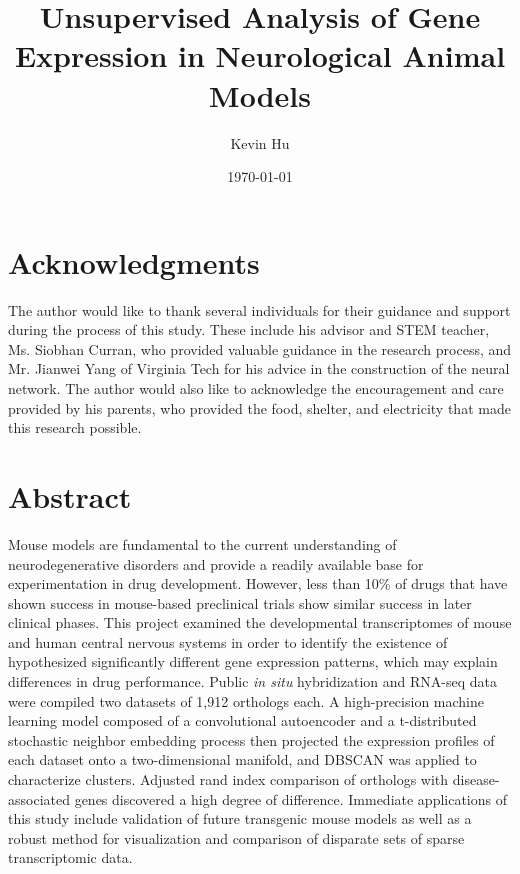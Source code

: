 \documentclass[12pt,oneside,onecolumn,a4paper]{article}
\title{\vspace{6cm}Unsupervised Analysis of Gene Expression in Neurological Animal Models}
\author{Kevin Hu}
\affil{Massachusetts Academy of Math and Science at WPI\vspace{-0.4cm}}
\date{\today}
\begin{document}
\maketitle
\thispagestyle{empty}

\clearpage

\break
\tableofcontents
\break

\section*{Acknowledgments}

The author would like to thank several individuals for their guidance and support during the process of this study. These include his advisor and STEM teacher, Ms. Siobhan Curran, who provided valuable guidance in the research process, and Mr. Jianwei Yang of Virginia Tech for his advice in the construction of the neural network. The author would also like to acknowledge the encouragement and care provided by his parents, who provided the food, shelter, and electricity that made this research possible.

\break

\section{Abstract}

Mouse models are fundamental to the current understanding of neurodegenerative disorders and provide a readily available base for experimentation in drug development. However, less than 10\% of drugs that have shown success in mouse-based preclinical trials show similar success in later clinical phases. This project examined the developmental transcriptomes of mouse and human central nervous systems in order to identify the existence of hypothesized significantly different gene expression patterns, which may explain differences in drug performance. Public \textit{in situ} hybridization and RNA-seq data were compiled two datasets of 1,912 orthologs each. A high-precision machine learning model composed of a convolutional autoencoder and a t-distributed stochastic neighbor embedding process then projected the expression profiles of each dataset onto a two-dimensional manifold, and DBSCAN was applied to characterize clusters. Adjusted rand index comparison of orthologs with disease-associated genes discovered a high degree of difference. Immediate applications of this study include validation of future transgenic mouse models as well as a robust method for visualization and comparison of disparate sets of sparse transcriptomic data.
\end{document}
